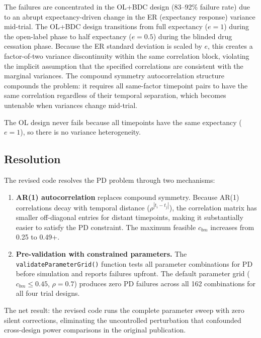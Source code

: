 \documentclass[11pt]{article}
\begin{document}
The failures are concentrated in the OL+BDC design (83--92\%
failure rate) due to an abrupt expectancy-driven change in the
ER (expectancy response) variance mid-trial. The OL+BDC design
transitions from full expectancy ($e = 1$) during the open-label
phase to half expectancy ($e = 0.5$) during the blinded drug
cessation phase. Because the ER standard deviation is scaled by
$e$, this creates a factor-of-two variance discontinuity within
the same correlation block, violating the implicit assumption
that the specified correlations are consistent with the marginal
variances. The compound symmetry autocorrelation structure
compounds the problem: it requires all same-factor timepoint
pairs to have the same correlation regardless of their temporal
separation, which becomes untenable when variances change
mid-trial.

The OL design never fails because all timepoints have the same
expectancy ($e = 1$), so there is no variance heterogeneity.

\subsection{Resolution}

The revised code resolves the PD problem through two mechanisms:

\begin{enumerate}
  \item \textbf{AR(1) autocorrelation} replaces compound symmetry. Because
    AR(1) correlations decay with temporal distance ($\rho^{|t_i -
    t_j|}$), the correlation matrix has smaller off-diagonal entries
    for distant timepoints, making it substantially easier to
    satisfy the PD constraint. The maximum feasible $c_{bm}$
    increases from 0.25 to 0.49+.

  \item \textbf{Pre-validation with constrained parameters.} The
    \texttt{validateParameterGrid()} function tests all parameter
    combinations for PD before simulation and reports failures
    upfront. The default parameter grid ($c_{bm} \leq 0.45$,
    $\rho = 0.7$) produces zero PD failures across all 162
    combinations for all four trial designs.
\end{enumerate}

The net result: the revised code runs the complete parameter
sweep with zero silent corrections, eliminating the uncontrolled
perturbation that confounded cross-design power comparisons in
the original publication.
\end{document}
